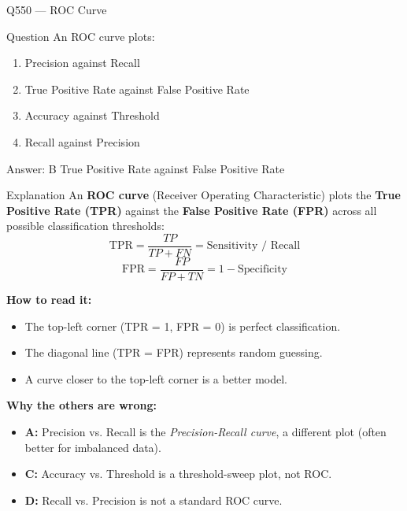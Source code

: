 \documentclass[aspectratio=169,8pt]{beamer}
\begin{document}
	
	\begin{frame}{Q550 --- ROC Curve}
		\begin{block}{Question}
			An ROC curve plots:
			\begin{enumerate}
				\item Precision against Recall
				\item True Positive Rate against False Positive Rate
				\item Accuracy against Threshold
				\item Recall against Precision
			\end{enumerate}
		\end{block}
		
		\begin{exampleblock}{Answer: B}
			True Positive Rate against False Positive Rate
		\end{exampleblock}
		
		\begin{block}{Explanation}
			An \textbf{ROC curve} (Receiver Operating Characteristic) plots the
			\textbf{True Positive Rate (TPR)} against the \textbf{False Positive Rate (FPR)}
			across all possible classification thresholds:
			\[
			\text{TPR} = \frac{TP}{TP+FN} = \text{Sensitivity / Recall}
			\]
			\[
			\text{FPR} = \frac{FP}{FP+TN} = 1 - \text{Specificity}
			\]
			
			\textbf{How to read it:}
			\begin{itemize}
				\item The top-left corner (TPR = 1, FPR = 0) is perfect classification.
				\item The diagonal line (TPR = FPR) represents random guessing.
				\item A curve closer to the top-left corner is a better model.
			\end{itemize}
			
			\textbf{Why the others are wrong:}
			\begin{itemize}
				\item \textbf{A:} Precision vs. Recall is the \emph{Precision-Recall curve},
				a different plot (often better for imbalanced data).
				\item \textbf{C:} Accuracy vs. Threshold is a threshold-sweep plot, not ROC.
				\item \textbf{D:} Recall vs. Precision is not a standard ROC curve.
			\end{itemize}
		\end{block}
	\end{frame}
	
\end{document}
